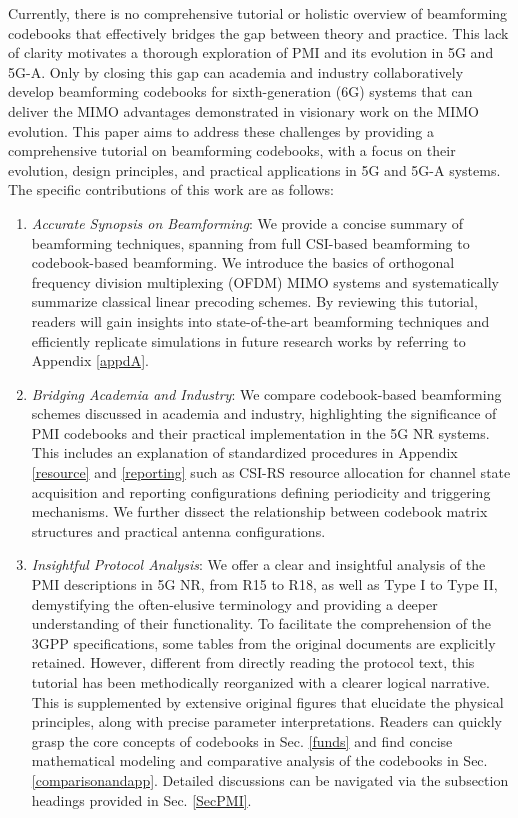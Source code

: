 \documentclass[lettersize,journal]{IEEEtran}
\begin{document}
Currently, there is no comprehensive tutorial or holistic overview of beamforming codebooks that effectively bridges the gap between theory and practice. This lack of clarity motivates a thorough exploration of PMI and its evolution in 5G and 5G-A. Only by closing this gap can academia and industry collaboratively develop beamforming codebooks for sixth-generation (6G) systems that can deliver the MIMO advantages demonstrated in visionary work on the MIMO evolution. This paper aims to address these challenges by providing a comprehensive tutorial on beamforming codebooks, with a focus on their evolution, design principles, and practical applications in 5G and 5G-A systems. The specific contributions of this work are as follows:
\begin{enumerate}
    \item \emph{Accurate Synopsis on Beamforming}: We provide a concise summary of beamforming techniques, spanning from full CSI-based beamforming to codebook-based beamforming. We introduce the basics of orthogonal frequency division multiplexing (OFDM) MIMO systems and systematically summarize classical linear precoding schemes. By reviewing this tutorial, readers will gain insights into state-of-the-art beamforming techniques and efficiently replicate simulations in future research works by referring to Appendix \ref{appdA}.
   
    \item \emph{Bridging Academia and Industry}: We compare codebook-based beamforming schemes discussed in academia and industry, highlighting the significance of PMI codebooks and their practical implementation in the 5G NR systems. This includes an explanation of standardized procedures in Appendix \ref{resource} and \ref{reporting} such as CSI-RS resource allocation for channel state acquisition and reporting configurations defining periodicity and triggering mechanisms. We further dissect the relationship between codebook matrix structures and practical antenna configurations. 
    
    \item \emph{Insightful Protocol Analysis}: We offer a clear and insightful analysis of the PMI descriptions in 5G NR, from R15 to R18, as well as Type I to Type II, demystifying the often-elusive terminology and providing a deeper understanding of their functionality. To facilitate the comprehension of the 3GPP specifications, some tables from the original documents are explicitly retained. However, different from directly reading the protocol text, this tutorial has been methodically reorganized with a clearer logical narrative. This is supplemented by extensive original figures that elucidate the physical principles, along with precise parameter interpretations. Readers can quickly grasp the core concepts of codebooks in Sec. \ref{funds} and find concise mathematical modeling and comparative analysis of the codebooks in Sec. \ref{comparisonandapp}. Detailed discussions can be navigated via the subsection headings provided in Sec. \ref{SecPMI}.



\end{enumerate}
\end{document}
